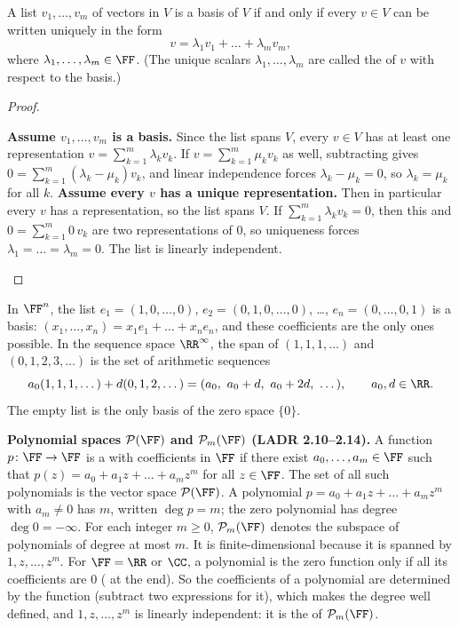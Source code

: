 \documentclass[10pt]{scrartcl}
\newcommand{\PP}{\mathcal P}
\begin{document}
\begin{proposition*}
  A list $v_1,\dots,v_m$ of vectors in $V$ is a basis of $V$ if and only if every $v\in V$ can be written uniquely in the form
  \[
    v = \lambda_1v_1 + \dots + \lambda_mv_m,
  \]
  where $\lambda_1,\dots,\lambda_m\in\FF$. (The unique scalars $\lambda_1,\dots,\lambda_m$ are called the  of $v$ with respect to the basis.)
\end{proposition*}
\begin{proof}
  \begin{steps}
    \ii \textbf{Assume $v_1,\dots,v_m$ is a basis.} Since the list spans $V$, every $v\in V$ has at least one representation $v=\sum_{k=1}^m\lambda_kv_k$. If $v=\sum_{k=1}^m\mu_kv_k$ as well, subtracting gives $0=\sum_{k=1}^m(\lambda_k-\mu_k)v_k$, and linear independence forces $\lambda_k-\mu_k=0$, so $\lambda_k=\mu_k$ for all $k$.
    \ii \textbf{Assume every $v$ has a unique representation.} Then in particular every $v$ has a representation, so the list spans $V$. If $\sum_{k=1}^m\lambda_kv_k=0$, then this and $0=\sum_{k=1}^m 0\,v_k$ are two representations of $0$, so uniqueness forces $\lambda_1=\dots=\lambda_m=0$. The list is linearly independent.
  \end{steps}
\end{proof}

\begin{example*}
  \begin{itemize}
    \ii In $\FF^n$, the list $e_1=(1,0,\dots,0)$, $e_2=(0,1,0,\dots,0)$, \dots, $e_n=(0,\dots,0,1)$ is a basis: $(x_1,\dots,x_n)=x_1e_1+\dots+x_ne_n$, and these coefficients are the only ones possible.
    \ii In the sequence space $\RR^\infty$, the span of $(1,1,1,\dots)$ and $(0,1,2,3,\dots)$ is the set of arithmetic sequences
    \[
      a_0(1,1,1,\dots)+d(0,1,2,\dots)=(a_0,\ a_0+d,\ a_0+2d,\ \dots),\qquad a_0,d\in\RR.
    \]
    \ii The empty list is the only basis of the zero space $\{0\}$.
  \end{itemize}
\end{example*}

\textbf{Polynomial spaces $\PP(\FF)$ and $\PP_m(\FF)$ (LADR 2.10--2.14).} A function $p\colon\FF\to\FF$ is a  with coefficients in $\FF$ if there exist $a_0,\dots,a_m\in\FF$ such that $p(z)=a_0+a_1z+\dots+a_mz^m$ for all $z\in\FF$. The set of all such polynomials is the vector space $\PP(\FF)$. A polynomial $p=a_0+a_1z+\dots+a_mz^m$ with $a_m\ne 0$ has  $m$, written $\deg p=m$; the zero polynomial has degree $\deg 0=-\infty$. For each integer $m\ge 0$, $\PP_m(\FF)$ denotes the subspace of polynomials of degree at most $m$. It is finite-dimensional because it is spanned by $1,z,\dots,z^m$. For $\FF=\RR$ or $\CC$, a polynomial is the zero function only if all its coefficients are $0$ ( at the end). So the coefficients of a polynomial are determined by the function (subtract two expressions for it), which makes the degree well defined, and $1,z,\dots,z^m$ is linearly independent: it is the  of $\PP_m(\FF)$.
\end{document}
